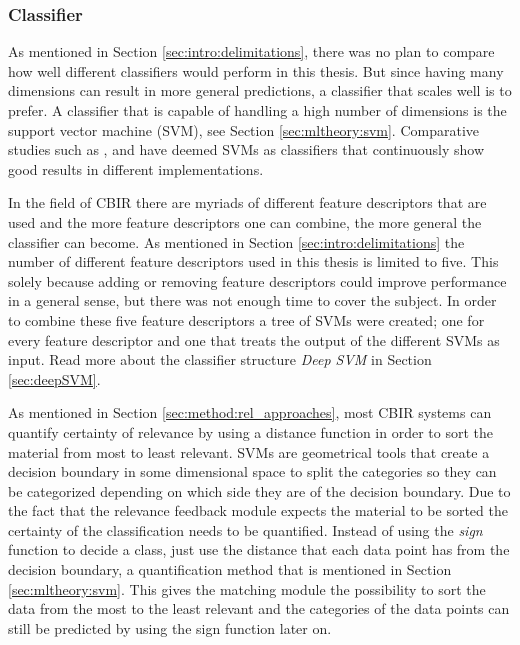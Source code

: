 \subsubsection{Classifier}
\label{sec:method:proposed:matching:classifier}
As mentioned in Section \ref{sec:intro:delimitations}, there was no plan to compare how well different classifiers would perform in this thesis. 
But since having many dimensions can result in more general predictions, a classifier that scales well is to prefer. A classifier that is capable of handling a high number of dimensions is the support vector machine (SVM), see Section \ref{sec:mltheory:svm}. 
Comparative studies such as \cite{IRJET2017classificationMethods}, \cite{SMMR2016comparisionClassificationMethods} and \cite{Informatica2007revClassification} have deemed SVMs as classifiers that continuously show good results in different implementations. 

In the field of CBIR there are myriads of different feature descriptors that are used and the more feature descriptors one can combine, the more general the classifier can become. As mentioned in Section \ref{sec:intro:delimitations} the number of different feature descriptors used in this thesis is limited to five. This solely because adding or removing feature descriptors could improve performance in a general sense, but there was not enough time to cover the subject. In order to combine these five feature descriptors a tree of SVMs were created; one for every feature descriptor and one that treats the output of the different SVMs as input. Read more about the classifier structure \emph{Deep SVM} in Section \ref{sec:deepSVM}. 

As mentioned in Section \ref{sec:method:rel_approaches}, most CBIR systems can quantify certainty of relevance by using a distance function in order to sort the material from most to least relevant. SVMs are geometrical tools that create a decision boundary in some dimensional space to split the categories so they can be categorized depending on which side they are of the decision boundary. Due to the fact that the relevance feedback module expects the material to be sorted the certainty of the classification needs to be quantified. Instead of using the \emph{sign} function to decide a class, just use the distance that each data point has from the decision boundary, a quantification method that is mentioned in Section \ref{sec:mltheory:svm}. This gives the matching module the possibility to sort the data from the most to the least relevant and the categories of the data points can still be predicted by using the sign function later on.


